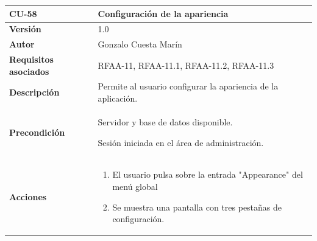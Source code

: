 \documentclass[
]{article}
\providecommand{\tightlist}{%
  \setlength{\itemsep}{0pt}\setlength{\parskip}{0pt}}
\begin{document}
\begin{longtable}[]{@{}ll@{}}
\toprule
\begin{minipage}[b]{0.22\columnwidth}\raggedright
\textbf{CU-58}\strut
\end{minipage} & \begin{minipage}[b]{0.72\columnwidth}\raggedright
\textbf{Configuración de la apariencia}\strut
\end{minipage}\tabularnewline
\midrule
\endhead
\begin{minipage}[t]{0.22\columnwidth}\raggedright
\textbf{Versión}\strut
\end{minipage} & \begin{minipage}[t]{0.72\columnwidth}\raggedright
1.0\strut
\end{minipage}\tabularnewline
\begin{minipage}[t]{0.22\columnwidth}\raggedright
\textbf{Autor}\strut
\end{minipage} & \begin{minipage}[t]{0.72\columnwidth}\raggedright
Gonzalo Cuesta Marín\strut
\end{minipage}\tabularnewline
\begin{minipage}[t]{0.22\columnwidth}\raggedright
\textbf{Requisitos asociados}\strut
\end{minipage} & \begin{minipage}[t]{0.72\columnwidth}\raggedright
RFAA-11, RFAA-11.1, RFAA-11.2, RFAA-11.3\strut
\end{minipage}\tabularnewline
\begin{minipage}[t]{0.22\columnwidth}\raggedright
\textbf{Descripción}\strut
\end{minipage} & \begin{minipage}[t]{0.72\columnwidth}\raggedright
Permite al usuario configurar la apariencia de la aplicación.\strut
\end{minipage}\tabularnewline
\begin{minipage}[t]{0.22\columnwidth}\raggedright
\textbf{Precondición}\strut
\end{minipage} & \begin{minipage}[t]{0.72\columnwidth}\raggedright
Servidor y base de datos disponible.

Sesión iniciada en el área de administración.\strut
\end{minipage}\tabularnewline
\begin{minipage}[t]{0.22\columnwidth}\raggedright
\textbf{Acciones}\strut
\end{minipage} & \begin{minipage}[t]{0.72\columnwidth}\raggedright
\begin{enumerate}
\def\labelenumi{\arabic{enumi}.}
\tightlist
\item
  El usuario pulsa sobre la entrada "Appearance" del menú global
\item
  Se muestra una pantalla con tres pestañas de configuración.


\end{enumerate}
\end{minipage}
\end{longtable}
\end{document}
